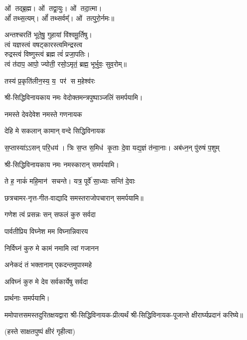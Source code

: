 \begin{center}
ओं तद्ब्र॒ह्म। ओं तद्वा॒युः। ओं तदा॒त्मा।\\ ओं᳚ तथ्स॒त्यम्‌।
ओं᳚ तथ्सर्वम्᳚‌। ओं तत्पुरो॒र्नमः॥\medskip

अन्तश्चरति॑ भूते॒षु॒ गुहायां वि॑श्वमू॒र्तिषु। \\
त्वं यज्ञस्त्वं वषट्कारस्त्वमिन्द्रस्त्व\\ रुद्रस्त्वं विष्णुस्त्वं ब्रह्म त्वं॑ प्रजा॒पतिः। \\
त्वं त॑दाप॒ आपो॒ ज्योती॒ रसो॒ऽमृतं॒ ब्रह्म॒ भूर्भुवः॒ सुव॒रोम्‌॥\medskip

{तस्य॑ प्र॒कृति॑लीन॒स्य॒ य॒ पर॑ स म॒हेश्व॑रः}
\medskip

श्री-सिद्धिविनायकाय नमः वेदोक्तमन्त्रपुष्पाञ्जलिं समर्पयामि।\medskip

{नमस्ते देवदेवेश नमस्ते गणनायक} 

{देहि मे सकलान् कामान् वन्दे सिद्धिविनायक} 

{स॒प्तास्या॑ऽऽसन्  परि॒धय॑। त्रिः स॒प्त स॒मिध॑ कृ॒ताः}
{दे॒वा यद्य॒ज्ञं त॑न्वा॒नाः। अब॑ध्न॒न् पु॑रुषं प॒शुम्}

श्री-सिद्धिविनायकाय नमः नमस्कारान् समर्पयामि।\medskip


{ते ह॒ नाकं॑ महि॒मान॑ सचन्ते। यत्र॒ पूर्वे॑ सा॒ध्याः सन्ति॑ दे॒वाः}

छत्रचामर-नृत्त-गीत-वाद्यादि समस्तराजोपचारान् समर्पयामि॥\medskip

{गणेश त्वं प्रसन्नः सन् सफलं कुरु सर्वदा}

{पार्वतीप्रिय विघ्नेश मम विघ्नान्निवारय} 

{निर्विघ्नं कुरु मे कामं नमामि त्वां गजानन}

{अनेकदं तं भक्तानाम् एकदन्तमुपास्महे}

{अविघ्नं कुरु मे देव सर्वकार्येषु सर्वदा}

प्रार्थनाः समर्पयामि।

\resetShloka
ममोपात्तसमस्तदुरितक्षयद्वारा श्री-सिद्धिविनायक-प्रीत्यर्थं श्री-सिद्धिविनायक-पूजान्ते क्षीरार्घ्यप्रदानं करिष्ये॥

(हस्ते साक्षतपुष्पं क्षीरं गृहीत्वा)


\end{center}
